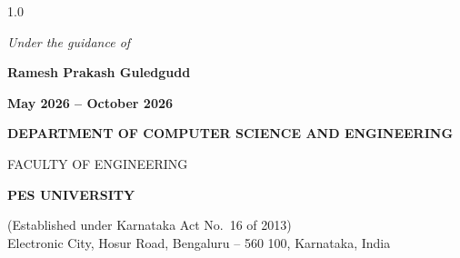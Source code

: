 \begin{titlepage}
\begin{spacing}{1.0}
\vspace{0.5em}
{\normalsize\itshape Under the guidance of\par}
\vspace{0.2em}
{\large\bfseries Ramesh Prakash Guledgudd\par}

\vspace{0.6em}
{\normalsize\bfseries\color{pesmaroon} May 2026 -- October 2026\par}

\vfill

{\normalsize\bfseries DEPARTMENT OF COMPUTER SCIENCE AND ENGINEERING\par}
{\normalsize FACULTY OF ENGINEERING\par}
{\large\bfseries PES UNIVERSITY\par}
{\footnotesize (Established under Karnataka Act No.\ 16 of 2013)\\
Electronic City, Hosur Road, Bengaluru -- 560 100, Karnataka, India\par}
\end{spacing}
\end{titlepage}

